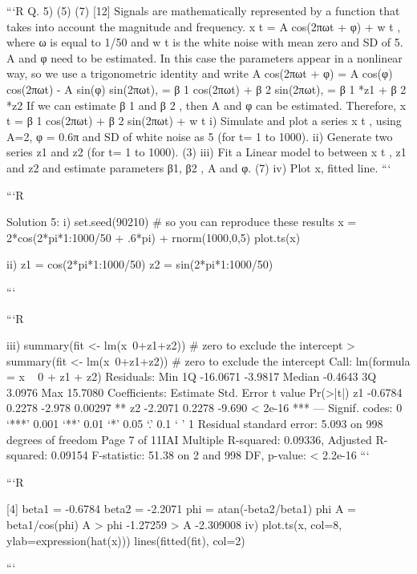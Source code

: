 \documentclass[a4paper,12pt]{article}
\begin{document}
```R
Q. 5)
(5)
(7)
[12]
Signals are mathematically represented by a function that takes into account the magnitude
and frequency.
x t = A cos(2πωt + φ) + w t , where ω is equal to 1/50 and w t is the white noise with mean
zero and SD of 5. A and φ need to be estimated.
In this case the parameters appear in a nonlinear way, so we use a trigonometric identity
and write
A cos(2πωt + φ) = A cos(φ) cos(2πωt) - A sin(φ) sin(2πωt),
= β 1 cos(2πωt) + β 2 sin(2πωt),
= β 1 *z1 + β 2 *z2
If we can estimate β 1 and β 2 , then A and φ can be estimated.
Therefore, x t = β 1 cos(2πωt) + β 2 sin(2πωt) + w t
i)
Simulate and plot a series x t , using A=2, φ = 0.6π and SD of white noise as 5 (for t= 1
to 1000).
ii) Generate two series z1 and z2 (for t= 1 to 1000). (3)
iii) Fit a Linear model to between x t , z1 and z2 and estimate parameters β1, β2 , A and φ. (7)
iv) Plot x, fitted line.
```


```R



Solution 5:
i)
set.seed(90210) # so you can reproduce these results
x = 2*cos(2*pi*1:1000/50 + .6*pi) + rnorm(1000,0,5)
plot.ts(x)

ii)
z1 = cos(2*pi*1:1000/50)
z2 = sin(2*pi*1:1000/50)

```


```R



iii)
summary(fit <- lm(x~0+z1+z2)) # zero to exclude the intercept
> summary(fit <- lm(x~0+z1+z2)) # zero to exclude the intercept
Call:
lm(formula = x ~ 0 + z1 + z2)
Residuals:
Min
1Q
-16.0671 -3.9817
Median
-0.4643
3Q
3.0976
Max
15.7080
Coefficients:
Estimate Std. Error t value Pr(>|t|)
z1 -0.6784
0.2278 -2.978 0.00297 **
z2 -2.2071
0.2278 -9.690 < 2e-16 ***
---
Signif. codes: 0 ‘***’ 0.001 ‘**’ 0.01 ‘*’ 0.05 ‘.’ 0.1 ‘ ’ 1
Residual standard error: 5.093 on 998 degrees of freedom
Page 7 of 11IAI
Multiple R-squared: 0.09336, Adjusted R-squared: 0.09154
F-statistic: 51.38 on 2 and 998 DF, p-value: < 2.2e-16
```


```R


[4]
beta1 = -0.6784
beta2 = -2.2071
phi = atan(-beta2/beta1)
phi
A = beta1/cos(phi)
A
> phi
 -1.27259
> A
 -2.309008
iv)
plot.ts(x, col=8, ylab=expression(hat(x)))
lines(fitted(fit), col=2)

```
\end{document}
